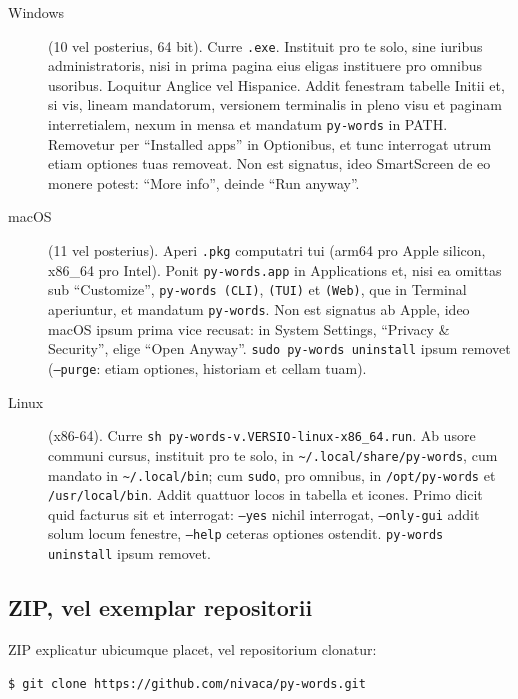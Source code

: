 \documentclass[12pt,
              article,
              oneside
              ]{memoir}
\begin{document}
\begin{description}
\item[Windows] (10 vel posterius, 64 bit). Curre \texttt{.exe}.
  Instituit pro te solo, sine iuribus administratoris, nisi in prima
  pagina eius eligas instituere pro omnibus usoribus. Loquitur Anglice vel
  Hispanice. Addit fenestram tabelle Initii et, si vis, lineam mandatorum,
  versionem terminalis in pleno visu et paginam interretialem, nexum in
  mensa et mandatum \texttt{py-words} in PATH. Removetur per ``Installed
  apps'' in Optionibus, et tunc interrogat utrum etiam optiones tuas
  removeat. Non est signatus, ideo SmartScreen de eo monere potest:
  ``More info'', deinde ``Run anyway''.
\item[macOS] (11 vel posterius). Aperi \texttt{.pkg} computatri tui
  (arm64 pro Apple silicon, x86\_64 pro Intel). Ponit
  \texttt{py-words.app} in Applications et, nisi ea omittas sub
  ``Customize'', \texttt{py-words (CLI)}, \texttt{(TUI)} et
  \texttt{(Web)}, que in Terminal aperiuntur, et mandatum
  \texttt{py-words}. Non est signatus ab Apple, ideo macOS ipsum prima
  vice recusat: in System Settings, ``Privacy \& Security'', elige ``Open
  Anyway''. \texttt{sudo py-words uninstall} ipsum removet
  (\texttt{--purge}: etiam optiones, historiam et cellam tuam).
\item[Linux] (x86-64). Curre \texttt{sh py-words-v.VERSIO-linux-x86\_64.run}.
  Ab usore communi cursus, instituit pro te solo, in
  \texttt{\textasciitilde/.local/share/py-words}, cum mandato in
  \texttt{\textasciitilde/.local/bin}; cum \texttt{sudo}, pro omnibus, in
  \texttt{/opt/py-words} et \texttt{/usr/local/bin}. Addit quattuor locos
  in tabella et icones. Primo dicit quid facturus sit et interrogat:
  \texttt{--yes} nichil interrogat, \texttt{--only-gui} addit solum locum
  fenestre, \texttt{--help} ceteras optiones ostendit. \texttt{py-words
  uninstall} ipsum removet.
\end{description}

\subsection{ZIP, vel exemplar repositorii}

%
ZIP explicatur ubicumque placet, vel repositorium clonatur:

\begin{verbatim}
$ git clone https://github.com/nivaca/py-words.git
\end{verbatim}
\end{document}
